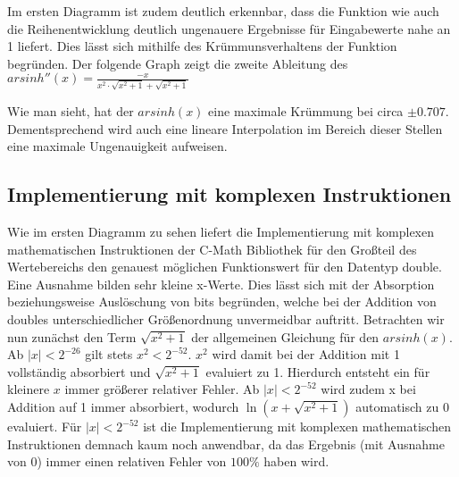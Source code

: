 \documentclass[course=erap] {aspdoc}
\begin{document}
     Im ersten Diagramm ist zudem deutlich erkennbar, dass die Funktion wie auch die Reihenentwicklung deutlich ungenauere Ergebnisse für Eingabewerte nahe an 1 liefert. Dies lässt sich mithilfe des Krümmunsverhaltens der Funktion begründen. Der folgende Graph zeigt die zweite Ableitung des $arsinh''(x) = \frac{-x}{x^2\cdot \sqrt{x^2+1}+\sqrt{x^2+1}}$
 
     
 
     Wie man sieht, hat der $arsinh(x)$ eine maximale Krümmung bei circa $\pm 0.707$. Dementsprechend wird auch eine lineare Interpolation im Bereich dieser Stellen eine maximale Ungenauigkeit aufweisen.
     
     \subsection{Implementierung mit komplexen Instruktionen}
     Wie im ersten Diagramm zu sehen liefert die Implementierung mit komplexen mathematischen Instruktionen der C-Math Bibliothek für den Großteil des Wertebereichs den genauest möglichen Funktionswert für den Datentyp double. Eine Ausnahme bilden sehr kleine x-Werte. Dies lässt sich mit der Absorption beziehungsweise Auslöschung von bits begründen, welche bei der Addition von doubles unterschiedlicher Größenordnung unvermeidbar auftritt. Betrachten wir nun zunächst den Term $\sqrt{x^2 + 1}$ der allgemeinen Gleichung für den $arsinh(x)$. Ab $|x|<2^{-26}$ gilt stets $x^2<2^{-52}$. $x^2$ wird damit bei der Addition mit 1 vollständig absorbiert und $\sqrt{x^2 + 1}$ evaluiert zu 1. Hierdurch entsteht ein für kleinere $x$ immer größerer relativer Fehler. Ab $|x|<2^{-52}$ wird zudem x bei Addition auf 1 immer absorbiert, wodurch $\ln{(x+\sqrt{x^2 + 1})}$ automatisch zu 0 evaluiert. Für $|x|<2^{-52}$ ist die Implementierung mit komplexen mathematischen Instruktionen demnach kaum noch anwendbar, da das Ergebnis (mit Ausnahme von 0) immer einen relativen Fehler von $100\%$ haben wird.
     
\end{document}
